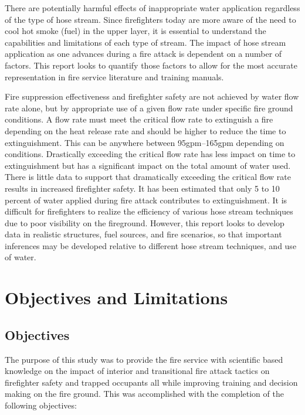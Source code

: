 \documentclass[12pt,oneside]{book}
\begin{document}
There are potentially harmful effects of inappropriate water application regardless of the type of hose stream. Since firefighters today are more aware of the need to cool hot smoke (fuel) in the upper layer, it is essential to understand the capabilities and limitations of each type of stream. The impact of hose stream application as one advances during a fire attack is dependent on a number of factors. This report looks to quantify those factors to allow for the most accurate representation in fire service literature and training manuals. 

Fire suppression effectiveness and firefighter safety are not achieved by water flow rate alone, but by appropriate use of a given flow rate under specific fire ground conditions. A flow rate must meet the critical flow rate to extinguish a fire depending on the heat release rate and should be higher to reduce the time to extinguishment. This can be anywhere between 95gpm--165gpm depending on conditions. Drastically exceeding the critical flow rate has less impact on time to extinguishment but has a significant impact on the total amount of water used. There is little data to support that dramatically exceeding the critical flow rate results in increased firefighter safety. It has been estimated that only 5 to 10 percent of water applied during fire attack contributes to extinguishment. It is difficult for firefighters to realize the efficiency of various hose stream techniques due to poor visibility on the fireground. However, this report looks to develop data in realistic structures, fuel sources, and fire scenarios, so that important inferences may be developed relative to different hose stream techniques, and use of water.

\clearpage

\chapter{Objectives and Limitations}

\section {Objectives}

The purpose of this study was to provide the fire service with scientific based knowledge on the impact of interior and transitional fire attack tactics on firefighter safety and trapped occupants all while improving training and decision making on the fire ground. This was accomplished with the completion of the following objectives:
\end{document}

